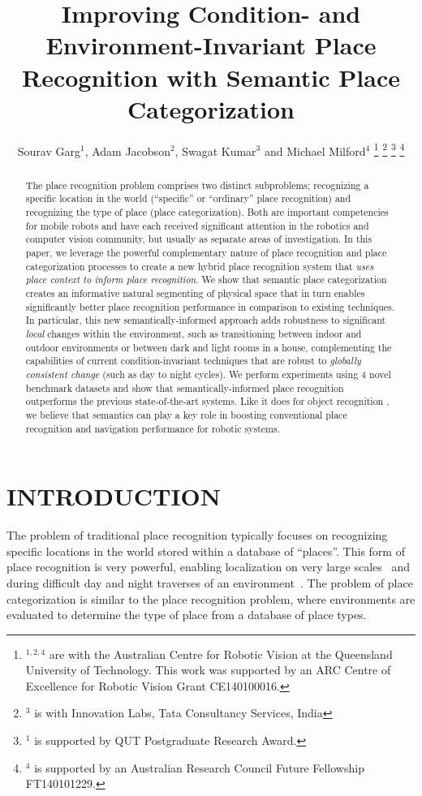 \documentclass[letterpaper, 10 pt, conference]{ieeeconf}  %
\title{\LARGE \bf
Improving Condition- and Environment-Invariant Place Recognition with Semantic Place Categorization
}
\author{Sourav Garg$^{1}$, Adam Jacobson$^{2}$, Swagat Kumar$^{3}$ and Michael Milford$^{4}$%
\thanks{$^{1,2,4}$ are with the Australian Centre for Robotic Vision at the Queensland University of Technology. This work was supported by an ARC Centre of Excellence for Robotic Vision Grant CE140100016.} 
\thanks{$^{3}$ is with Innovation Labs, Tata Consultancy Services, India}%
\thanks{$^{1}$ is supported by QUT Postgraduate Research Award.}%
\thanks{$^{4}$ is supported by an Australian Research Council Future Fellowship FT140101229.}%
}
\begin{document}
\maketitle
\thispagestyle{empty}
\pagestyle{empty}


\begin{abstract}
The place recognition problem comprises two distinct subproblems; recognizing a specific location in the world (``specific'' or ``ordinary'' place recognition) and recognizing the type of place (place categorization). Both are important competencies for mobile robots and have each received significant attention in the robotics and computer vision community, but usually as separate areas of investigation. In this paper, we leverage the powerful complementary nature of place recognition and place categorization processes to create a new hybrid place recognition system that \emph{uses place context to inform place recognition}. We show that semantic place categorization creates an informative natural segmenting of physical space that in turn enables significantly better place recognition performance in comparison to existing techniques. In particular, this new semantically-informed approach adds robustness to significant \emph{local} changes within the environment, 
such as transitioning between indoor and outdoor environments or between dark and light rooms in a house, complementing the capabilities of current condition-invariant techniques that are robust to \emph{globally consistent change} (such as day to night cycles). We perform experiments using 4 novel benchmark datasets and show that semantically-informed place recognition outperforms the previous state-of-the-art systems. Like it does for object recognition \cite{sunderhauf2016place}, we believe that  semantics can play a key role in boosting conventional place recognition and navigation performance for robotic systems.
\end{abstract}

\section{INTRODUCTION}

The problem of traditional place recognition typically focuses on recognizing specific locations in the world stored within a database of ``places''. This form of place recognition is very powerful, enabling localization on very large scales~\cite{Cummins2009} and during difficult day and night traverses of an environment~\cite{Milford2012}. The problem of place categorization is similar to the place recognition problem, where environments are evaluated to determine the type of place from a database of place types.
\end{document}
